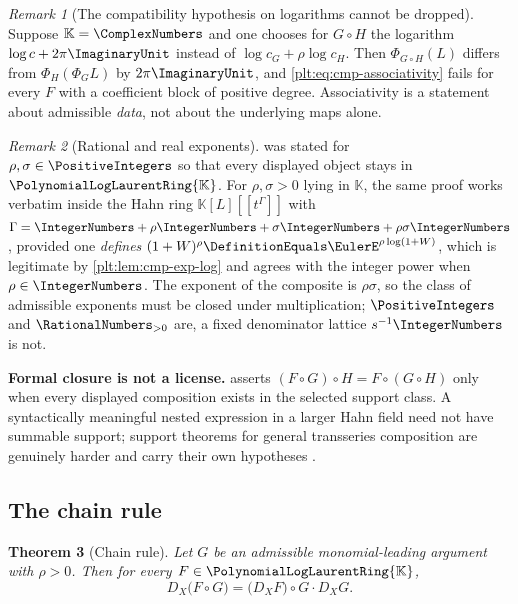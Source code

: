\documentclass[11pt,oneside]{article}
\theoremstyle{plain}
\newtheorem{theorem}{Theorem}[section]
\theoremstyle{definition}
\theoremstyle{remark}
\newtheorem{remark}[theorem]{Remark}
\newcommand{\K}{\mathbb{K}}
\newcommand{\PLlau}{\PolynomialLogLaurentRing{\K}}       %
\newcommand{\DX}{D_{X}}                                  %
\newcommand{\compose}{\mathbin{\circ}}
\begin{document}
\begin{remark}[The compatibility hypothesis on logarithms cannot be dropped]
Suppose \(\K=\ComplexNumbers\) and one chooses for \(G\compose H\) the
logarithm \(\log c+2\pi\ImaginaryUnit\) instead of
\(\log c_{G}+\rho\log c_{H}\).  Then \(\Phi_{G\compose H}(L)\) differs from
\(\Phi_{H}(\Phi_{G}L)\) by \(2\pi\ImaginaryUnit\), and
\eqref{plt:eq:cmp-associativity} fails for every \(F\) with a coefficient
block of positive degree.  Associativity is a statement about admissible
\emph{data}, not about the underlying maps alone.
\end{remark}

\begin{remark}[Rational and real exponents]
 was stated for
\(\rho,\sigma\in\PositiveIntegers\) so that every displayed object stays in
\(\PLlau\).  For \(\rho,\sigma>0\) lying in \(\K\), the same proof works
verbatim inside the Hahn ring \(\K[L][[t^{\Gamma}]]\) with
\(\Gamma=\IntegerNumbers+\rho\IntegerNumbers+\sigma\IntegerNumbers
 +\rho\sigma\IntegerNumbers\), provided one \emph{defines}
\((1+W)^{\rho}\DefinitionEquals\EulerE^{\rho\log(1+W)}\), which is legitimate
by \cref{plt:lem:cmp-exp-log} and agrees with the integer power when
\(\rho\in\IntegerNumbers\).  The exponent of the composite is \(\rho\sigma\),
so the class of admissible exponents must be closed under multiplication;
\(\PositiveIntegers\) and \(\RationalNumbers_{>0}\) are, a fixed denominator
lattice \(s^{-1}\IntegerNumbers\) is not.
\end{remark}

\begin{warningbox}
\textbf{Formal closure is not a license.}  
asserts \((F\compose G)\compose H=F\compose(G\compose H)\) only when every
displayed composition exists in the selected support class.  A syntactically
meaningful nested expression in a larger Hahn field need not have summable
support; support theorems for general transseries composition are genuinely
harder and carry their own hypotheses \cite{edgar-composition,vanderhoeven-book}.
\end{warningbox}

\subsection{The chain rule}
\label{plt:sec:cmp-chain-rule}

\begin{theorem}[Chain rule]\label{plt:thm:cmp-chain-rule}
Let \(G\) be an admissible monomial-leading argument with \(\rho>0\).  Then
for every \(F\in\PLlau\),
\begin{equation}\label{plt:eq:cmp-chain-rule}
 \DX\bigl(F\compose G\bigr)=\bigl(\DX F\bigr)\compose G\cdot\DX G .
\end{equation}
\end{theorem}
\end{document}
